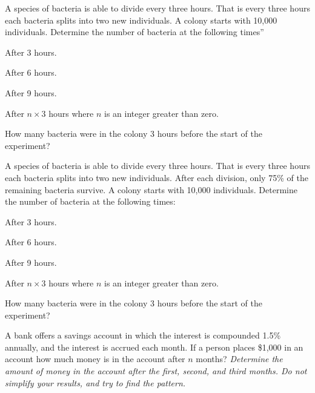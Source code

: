 \begin{problem}
\item A species of bacteria is able to divide every three hours. That
  is every three hours each bacteria splits into two new
  individuals. A colony starts with 10,000 individuals. Determine the
  number of bacteria at the following times''
  \begin{subproblem}
  \item After 3 hours.
    \vfill
  \item After 6 hours.
    \vfill
  \item After 9 hours.
    \vfill
  \item After $n\times 3$ hours where $n$ is an integer greater than zero.
    \vfill
  \item How many bacteria were in the colony 3 hours before the start
    of the experiment?
    \vfill
  \end{subproblem}

  \clearpage

\item A species of bacteria is able to divide every three hours. That
  is every three hours each bacteria splits into two new
  individuals. After each division, only 75\% of the remaining
  bacteria survive. A colony starts with 10,000 individuals. Determine
  the number of bacteria at the following times:
  \begin{subproblem}
  \item After 3 hours.
    \vfill
  \item After 6 hours.
    \vfill
  \item After 9 hours.
    \vfill
  \item After $n\times 3$ hours where $n$ is an integer greater than zero.
    \vfill
  \item How many bacteria were in the colony 3 hours before the start
    of the experiment?
    \vfill
  \end{subproblem}

  \clearpage

\item A bank offers a savings account in which the interest is
  compounded 1.5\% annually, and the interest is accrued each
  month. If a person places \$1,000 in an account how much money is in
  the account after $n$ months?
  \textit{Determine the amount of money in the account after the
    first, second, and third months. Do not simplify your results, and
  try to find the pattern.}


\end{problem}
